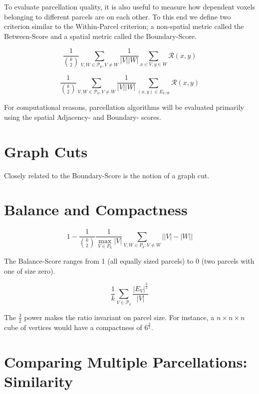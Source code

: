 To evaluate parcellation quality, it is also useful to measure how
dependent voxels belonging to different parcels are on each other. To
this end we define two criterion similar to the Within-Parcel criterion;
a non-spatial metric called the Between-Score and a spatial metric
called the Boundary-Score.

\begin{definition} \label{between-score}
\[ \frac{1}{\binom{k}{2}} \sum_{V, W \in \mathcal{P}_k, V \neq W}
   \frac{1}{|V||W|} \sum_{x \in V, y \in W} \mathcal{R}(x,y)
\]
\end{definition}

\begin{definition} \label{boundary-score}
\[ \frac{1}{\binom{k}{2}} \sum_{V, W \in \mathcal{P}_k, V \neq W}
   \frac{1}{|V||W|} \sum_{(x,y) \in E_{V,W}} \mathcal{R}(x,y)
\]
\end{definition}

For computational reasons, parcellation algorithms will be evaluated
primarily using the spatial Adjacency- and Boundary- scores.

\section{Graph Cuts}

Closely related to the Boundary-Score is the notion of a graph cut.

\section{Balance and Compactness}

\begin{definition} \label{balance-score}
\[ 1 - \frac{1}{\binom{k}{2}} \frac{1}{\max_{V \in P_k} |V|}
   \sum_{V,W \in P_k : V \neq W} \big| |V| - |W| \big| \]
\end{definition}

The Balance-Score ranges from 1 (all equally sized parcels) to
0 (two parcels with one of size zero).

\begin{definition} \label{compactness-score}
\[ \frac{1}{k} \sum_{V \in \mathcal{P}_k} \frac{|E_V|^\frac{3}{2}}{|V|}
\]
\end{definition}

The $\frac{3}{2}$ power makes the ratio invariant on parcel size.
For instance, a $n \times n \times n$ cube of vertices would have
a compactness of $6^{\frac{3}{2}}$.

\section{Comparing Multiple Parcellations: Similarity}
